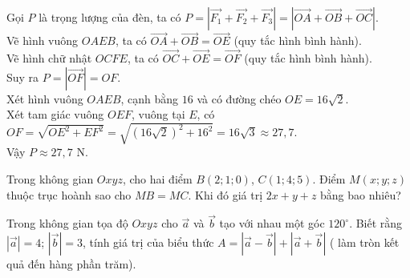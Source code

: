 \begin{ex}
{\begin{center}
\end{center}
Gọi $P$ là trọng lượng của đèn, ta có $P=\left|\overrightarrow{F_1}+\overrightarrow{F_2}+\overrightarrow{F_3}\right|=\left|\overrightarrow{OA}+\overrightarrow{OB}+\overrightarrow{OC}\right|$.\\
Vẽ hình vuông $OAEB$, ta có $\overrightarrow{OA}+\overrightarrow{OB}=\overrightarrow{OE}$ (quy tắc hình bình hành).\\
Vẽ hình chữ nhật $OCFE$, ta có $\overrightarrow{OC}+\overrightarrow{OE}=\overrightarrow{OF}$ (quy tắc hình bình hành).\\
Suy ra $P=\left|\overrightarrow{OF}\right|=OF$.\\
Xét hình vuông $OAEB$, cạnh bằng $16$ và có đường chéo $OE=16\sqrt{2}$.\\
Xét tam giác vuông $OEF$, vuông tại $E$, có $OF=\sqrt{OE^2+EF^2}=\sqrt{\left(16\sqrt{2}\right)^2+16^2}=16\sqrt{3}\approx 27{,}7$.\\
Vậy $P\approx 27{,}7$ N.
 }
\end{ex}

\begin{ex}%
Trong không gian $Oxyz$, cho hai điểm $B(2; 1; 0)$, $C(1; 4; 5)$. Điểm $M(x; y; z)$ thuộc trục hoành sao cho $MB=MC$. Khi đó giá trị $2x+y+z$ bằng bao nhiêu?
\end{ex}

\begin{ex}%
Trong không gian tọa độ $Oxyz$ cho $\overrightarrow{a}$ và $\overrightarrow{b}$ tạo với nhau một góc $120^{\circ}$. Biết rằng $|\overrightarrow{a}|=4$; $|\overrightarrow{b}|=3$, tính giá trị của biểu thức $A=|\overrightarrow{a}-\overrightarrow{b}|+|\overrightarrow{a}+\overrightarrow{b}|$ ( làm tròn kết quả đến hàng phần trăm).

\end{ex}

